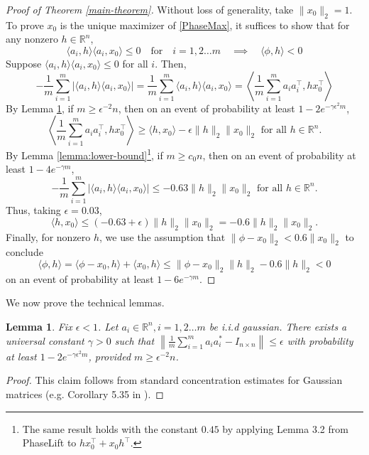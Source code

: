 \documentclass[12pt]{article}
\newcommand{\1}{\mathbf{1}}
\newcommand{\R}{\mathbb{R}}
\newcommand{\eps}{\epsilon}
\newtheorem{lemma}[theorem]{Lemma}
\begin{document}
\begin{proof}[Proof of Theorem \ref{main-theorem}]
Without loss of generality, take $\|x_0\|_2 = 1$.  To prove $x_0$ is the unique maximizer of \eqref{PhaseMax}, it suffices to show that for any nonzero $h \in \R^n$,
\[
\langle a_i, h \rangle \langle a_i, x_0 \rangle \leq 0 \quad \text{for} \quad i = 1,2\ldots m \quad \implies \quad \langle \phi, h \rangle < 0
\]
Suppose $\langle a_i, h \rangle \langle a_i, x_0 \rangle \leq 0$ for all $i$.  Then,
\[
-\frac{1}{m}\sum_{i=1}^m |\langle a_i, h \rangle \langle a_i, x_0 \rangle | = \frac{1}{m}\sum_{i=1}^m \langle a_i, h \rangle \langle a_i, x_0 \rangle  = \left \langle \frac{1}{m} \sum_{i=1}^m a_i a_i^\intercal , hx_0^\intercal \right \rangle
\]
By Lemma \ref{lem:isometry}, if $m \geq \eps^{-2} n$, then on an event of probability at least $1-2e^{-\gamma \eps^2 m}$,
\[
\left \langle \frac{1}{m} \sum_{i=1}^m a_i a_i^\intercal , hx_0^\intercal \right \rangle \geq \langle h, x_0 \rangle - \epsilon\|h\|_2\|x_0\|_2 \text{ for all $h\in \R^n$}.
\]
By  Lemma \ref{lemma:lower-bound}\footnote{The same result holds with the constant $0.45$  by applying Lemma 3.2 from PhaseLift \cite{CSV2013} to $h x_0^\intercal + x_0 h^\intercal$.}, if $m \geq c_0 n$, then on an event of probability at least $1 - 4 e^{-\gamma m}$,
\[
-\frac{1}{m}\sum_{i=1}^m |\langle a_i, h \rangle \langle a_i, x_0 \rangle | \leq -0.63 \|h\|_2 \|x_0\|_2 \text{ for all $h\in \R^n$}.
\]
Thus, taking $\eps = 0.03$,
\[
\langle h, x_0 \rangle \leq (-0.63+\eps) \|h\|_2 \|x_0\|_2 = -0.6 \|h\|_2\|x_0\|_2.
\]
Finally, for nonzero $h$, we use the assumption that $\| \phi - x_0 \|_2 < 0.6 \|x_0\|_2$ to conclude
\[
\langle \phi, h\rangle = \langle \phi - x_0, h\rangle + \langle x_0, h \rangle \leq \| \phi - x_0\|_2 \|h\|_2 - 0.6 \|h\|_2 <  0
\]
on an event of probability at least $1 - 6 e^{-\gamma m}$. 
\end{proof}

We now prove the technical lemmas.  
\begin{lemma}\label{lem:isometry}
Fix $\eps < 1$.  Let $a_i \in \mathbb{R}^n, i =1,2\ldots m$ be i.i.d gaussian.  There exists a universal constant $\gamma>0$ such that $\left\| \frac{1}{m} \sum_{i=1}^m a_i a_i^* - I_{n\times n} \right\| \leq \epsilon $ with probability at least $1-2 e^{-\gamma \eps^2 m}$, provided $m \geq \eps^{-2} n$.
\end{lemma}
\begin{proof}
This claim follows from standard concentration estimates for Gaussian matrices (e.g. Corollary 5.35 in \cite{V2012}).
\end{proof}
\end{document}
